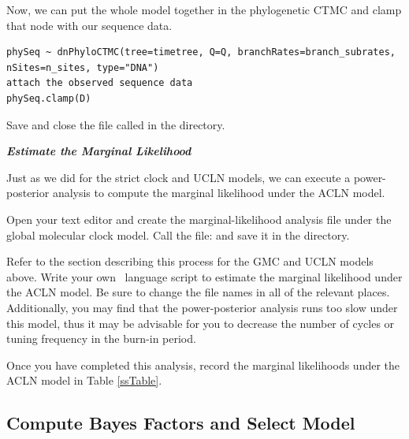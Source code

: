 Now, we can put the whole model together in the phylogenetic CTMC and clamp that node with our sequence data.
{\tt \begin{snugshade*}
\begin{lstlisting}
phySeq ~ dnPhyloCTMC(tree=timetree, Q=Q, branchRates=branch_subrates, nSites=n_sites, type="DNA")
attach the observed sequence data
phySeq.clamp(D)
\end{lstlisting}
\end{snugshade*}}

{\begin{framed}
Save and close the file called {\textcolor{red}{}} in the  directory.
\end{framed}}



\textbf{\textit{Estimate the Marginal Likelihood}}

Just as we did for the strict clock and UCLN models, we can execute a power-posterior analysis to compute the marginal likelihood under the ACLN model. 

{\begin{framed}
Open your text editor and create the marginal-likelihood analysis file under the global molecular clock model. Call the file: {\textcolor{red}{}} and save it in the  directory.
\end{framed}}

Refer to the section describing this process for the GMC and UCLN models above.
Write your own \Rev~language script to estimate the marginal likelihood under the ACLN model. 
Be sure to change the file names in all of the relevant places.
Additionally, you may find that the power-posterior analysis runs too slow under this model, thus it may be advisable for you to decrease the number of cycles or tuning frequency in the burn-in period.

{\begin{framed}
Once you have completed this analysis, record the marginal likelihoods under the ACLN model in Table \ref{ssTable}.
\end{framed}}

\FloatBarrier
\subsection{Compute Bayes Factors and Select Model}


